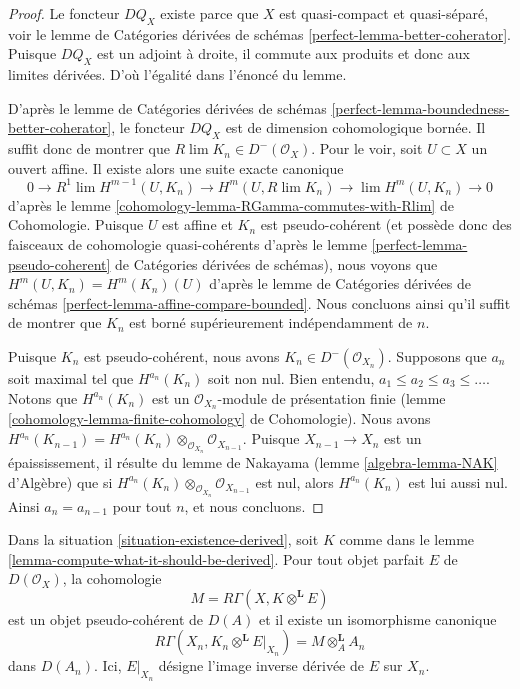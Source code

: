 \begin{proof}
Le foncteur $DQ_X$ existe parce que $X$ est quasi-compact et
quasi-séparé, voir le lemme de Catégories dérivées de schémas
\ref{perfect-lemma-better-coherator}.
Puisque $DQ_X$ est un adjoint à droite, il commute aux produits
et donc aux limites dérivées. D'où l'égalité
dans l'énoncé du lemme.

\medskip\noindent
D'après le lemme de Catégories dérivées de schémas
\ref{perfect-lemma-boundedness-better-coherator},
le foncteur $DQ_X$ est de dimension cohomologique bornée.
Il suffit donc de montrer que $R\lim K_n \in D^-(\mathcal{O}_X)$.
Pour le voir, soit $U \subset X$ un ouvert affine.
Il existe alors une suite exacte canonique
$$
0 \to
R^1\lim H^{m - 1}(U, K_n) \to H^m(U, R\lim K_n) \to
\lim H^m(U, K_n) \to 0
$$
d'après le lemme \ref{cohomology-lemma-RGamma-commutes-with-Rlim} de Cohomologie.
Puisque $U$ est affine et $K_n$ est pseudo-cohérent (et possède donc des
faisceaux de cohomologie quasi-cohérents d'après le lemme
\ref{perfect-lemma-pseudo-coherent} de Catégories dérivées de schémas),
nous voyons que $H^m(U, K_n) = H^m(K_n)(U)$ d'après le
lemme de Catégories dérivées de schémas
\ref{perfect-lemma-affine-compare-bounded}.
Nous concluons ainsi qu'il suffit de montrer que $K_n$
est borné supérieurement indépendamment de $n$.

\medskip\noindent
Puisque $K_n$ est pseudo-cohérent, nous avons $K_n \in D^-(\mathcal{O}_{X_n})$.
Supposons que $a_n$ soit maximal tel que $H^{a_n}(K_n)$ soit non nul.
Bien entendu, $a_1 \leq a_2 \leq a_3 \leq \ldots$.
Notons que $H^{a_n}(K_n)$ est un
$\mathcal{O}_{X_n}$-module de présentation finie
(lemme \ref{cohomology-lemma-finite-cohomology} de Cohomologie).
Nous avons $H^{a_n}(K_{n - 1}) =
H^{a_n}(K_n) \otimes_{\mathcal{O}_{X_n}} \mathcal{O}_{X_{n - 1}}$.
Puisque $X_{n - 1} \to X_n$ est un épaississement, il résulte du
lemme de Nakayama (lemme \ref{algebra-lemma-NAK} d'Algèbre) que si
$H^{a_n}(K_n) \otimes_{\mathcal{O}_{X_n}} \mathcal{O}_{X_{n - 1}}$
est nul, alors $H^{a_n}(K_n)$ est lui aussi nul. Ainsi $a_n = a_{n - 1}$
pour tout $n$, et nous concluons.
\end{proof}

\begin{lemma}
\label{lemma-compute-against-perfect-derived}
Dans la situation \ref{situation-existence-derived}, soit $K$ comme dans le
lemme \ref{lemma-compute-what-it-should-be-derived}. Pour tout objet parfait
$E$ de $D(\mathcal{O}_X)$, la cohomologie
$$
M = R\Gamma(X, K \otimes^\mathbf{L} E)
$$
est un objet pseudo-cohérent de $D(A)$ et il existe un isomorphisme canonique
$$
R\Gamma(X_n, K_n \otimes^\mathbf{L} E|_{X_n}) = M \otimes_A^\mathbf{L} A_n
$$
dans $D(A_n)$. Ici, $E|_{X_n}$ désigne l'image inverse dérivée de $E$ sur $X_n$.
\end{lemma}

